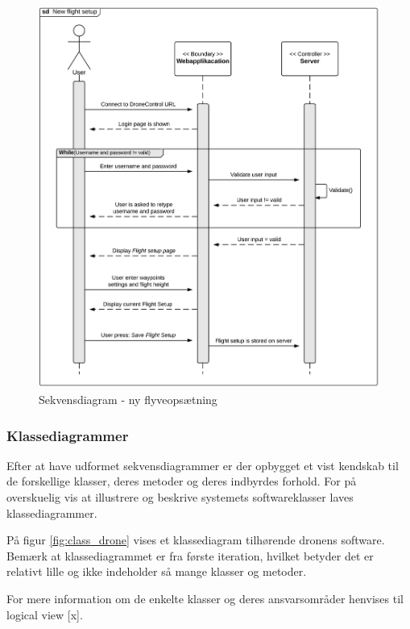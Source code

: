  
\begin{figure}[H]
	\centering
	\includegraphics[width=1\textwidth]{Billeder/sekvens.png}
	\vspace{-0.6cm}	
	\caption{Sekvensdiagram - ny flyveopsætning}
	\label{fig:login_flysetting}
\end{figure}

\newpage
\subsubsection*{Klassediagrammer}
\vspace{-0.3cm}	

Efter at have udformet sekvensdiagrammer er der opbygget et vist kendskab til de forskellige klasser, deres metoder og deres indbyrdes forhold. For på overskuelig vis at illustrere og beskrive systemets softwareklasser laves klassediagrammer.

På figur \ref{fig:class_drone} vises et klassediagram tilhørende dronens software. Bemærk at klassediagrammet er fra første iteration, hvilket betyder det er relativt lille og ikke indeholder så mange klasser og metoder.

For mere information om de enkelte klasser og deres ansvarsområder henvises til logical view [x].

